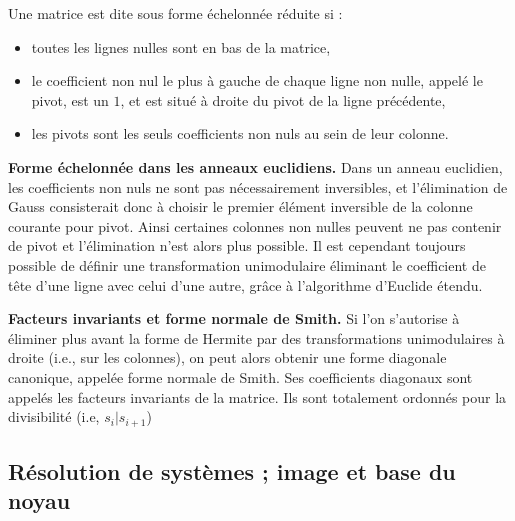 \begin{definition}
Une matrice est dite sous forme échelonnée réduite si :
 \begin{itemize}
  \item toutes les lignes nulles sont en bas de la matrice,
  \item le coefficient non nul le plus à gauche de chaque ligne non nulle, appelé le pivot, est un $1$, et est situé à droite du pivot de la ligne précédente,
  \item les pivots sont les seuls coefficients non nuls au sein de leur colonne. 
 \end{itemize}
\end{definition}

\begin{flushleft}
\textbf{Forme échelonnée dans les anneaux euclidiens.} Dans un anneau euclidien, les coefficients non nuls ne sont pas nécessairement inversibles, et l’élimination de Gauss consisterait donc à choisir le premier élément inversible de la colonne courante pour pivot. Ainsi certaines colonnes non nulles peuvent ne pas contenir
de pivot et l’élimination n’est alors plus possible. Il est cependant toujours possible de définir une transformation unimodulaire éliminant le coefficient de tête d’une ligne avec celui d’une autre, grâce à
l’algorithme d’Euclide étendu.
\end{flushleft}

\begin{flushleft}
\textbf{Facteurs invariants et forme normale de Smith.} Si l’on s’autorise à éliminer plus avant la forme de Hermite par des transformations unimodulaires à droite (i.e., sur les colonnes), on peut alors obtenir une forme diagonale canonique, appelée forme normale de Smith. Ses coefficients diagonaux sont appelés les facteurs
invariants de la matrice. Ils sont totalement ordonnés pour la divisibilité (i.e, $s_{i}\vert s_{i+1}$)
\end{flushleft}

\subsection{ Résolution de systèmes ; image et base du noyau}
